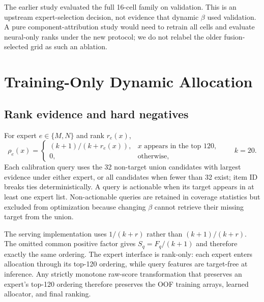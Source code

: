 \documentclass[runningheads]{llncs}
\newcommand{\rr}{\rho}
\begin{document}
The earlier study evaluated the full 16-cell family on validation. This is an
upstream expert-selection decision, not evidence that dynamic $\beta$ used
validation. A pure
component-attribution study would need to retrain all cells and evaluate
neural-only ranks under the new protocol; we do not relabel the older
fusion-selected grid as such an ablation.

\section{Training-Only Dynamic Allocation}
\subsection{Rank evidence and hard negatives}
For expert $e\in\{M,N\}$ and rank $r_e(x)$,
\begin{equation}
\rr_e(x)=
\begin{cases}
(k+1)/(k+r_e(x)),&x\text{ appears in the top 120},\\
0,&\text{otherwise},
\end{cases}
\qquad k=20.
\end{equation}
Each calibration query uses the 32 non-target union candidates with largest
evidence under either expert, or all candidates when fewer than 32 exist;
item ID breaks ties deterministically. A query is actionable when its target appears
in at least one expert list. Non-actionable queries are retained in coverage
statistics but excluded from optimization because changing $\beta$ cannot
retrieve their missing target from the union.

The serving implementation uses $1/(k+r)$ rather than $(k+1)/(k+r)$.
The omitted common positive factor gives $S_q=F_q/(k+1)$ and therefore exactly
the same ordering. The expert interface is rank-only: each expert enters
allocation through its top-120 ordering, while query features are target-free
at inference. Any strictly monotone raw-score transformation that preserves an
expert's top-120 ordering therefore preserves the OOF training arrays, learned
allocator, and final ranking.
\end{document}
